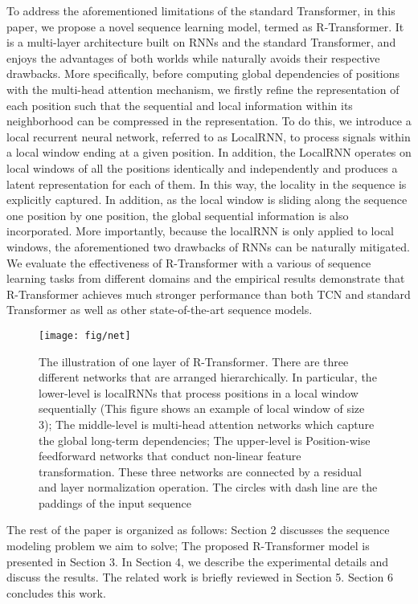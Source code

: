 \documentclass{article} \usepackage{iclr2019_conference,times}
\begin{document}
To address the aforementioned limitations of the standard Transformer, in this paper, we propose a novel sequence learning model, termed as R-Transformer. It is a multi-layer architecture built on RNNs and the standard Transformer, and enjoys the advantages of both worlds while naturally avoids their respective drawbacks. More specifically, before computing global dependencies of positions with the multi-head attention mechanism, we firstly refine the representation of each position such that the sequential and local information within its neighborhood can be compressed in the representation. To do this, we introduce a local recurrent neural network, referred to as LocalRNN, to process signals within a local window ending at a given position. In addition, the LocalRNN operates on local windows of all the positions identically and independently and produces a latent representation for each of them. In this way, the locality in the sequence is explicitly captured. In addition, as the local window is sliding along the sequence one position by one position, the global sequential information is also incorporated. More importantly, because the localRNN is only applied to local windows, the aforementioned two drawbacks of RNNs can be naturally mitigated. We evaluate the effectiveness of R-Transformer with a various of sequence learning tasks from different domains and the empirical results demonstrate that R-Transformer achieves much stronger performance than both TCN and standard Transformer as well as other state-of-the-art sequence models. 






 \begin{figure}
\label{fig:r-transformer}
	\begin{center}
		\texttt{[image: fig/net]}
	\end{center}
	\caption{The illustration of one layer of R-Transformer. There are three different networks that are arranged hierarchically. In particular, the lower-level is localRNNs that process positions in a local window sequentially (This figure shows an example of local window of size 3); The middle-level is multi-head attention networks which capture the global long-term dependencies; The upper-level is Position-wise feedforward networks that conduct non-linear feature transformation. These three networks are connected by a residual and layer normalization operation. The circles with dash line are the paddings of the input sequence}
\end{figure}
The rest of the paper is organized as follows: Section 2 discusses the sequence modeling problem we aim to solve; The proposed R-Transformer model is presented in Section 3. In Section 4, we describe the experimental details and discuss the results. The related work is briefly reviewed in Section 5. Section 6 concludes this work.
\end{document}
